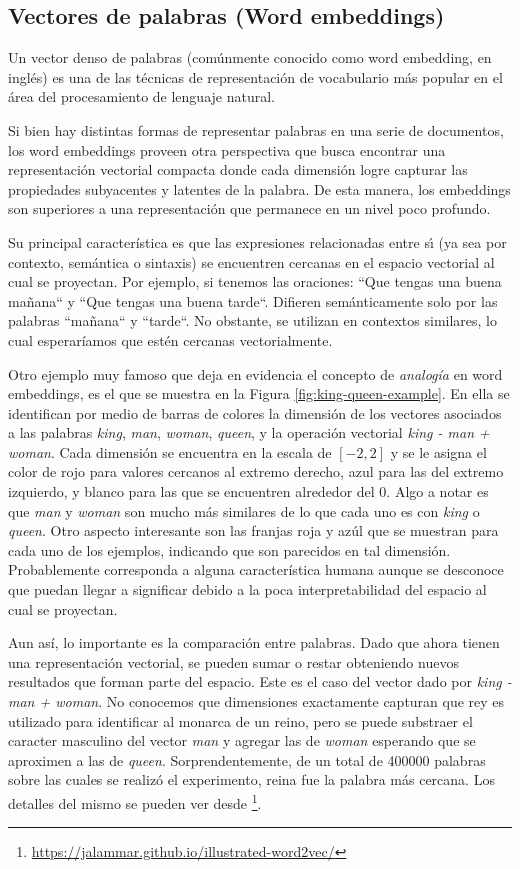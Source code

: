 \subsection{Vectores de palabras (Word embeddings)}

Un vector denso de palabras (comúnmente conocido como word embedding, en inglés)
es una de las técnicas de representación de vocabulario más popular en el área
del procesamiento de lenguaje natural.

Si bien hay distintas formas de representar palabras en una serie de documentos,
los word embeddings proveen otra perspectiva que busca encontrar una
representación vectorial compacta donde cada dimensión logre capturar las
propiedades subyacentes y latentes de la palabra. De esta manera, los embeddings
son superiores a una representación que permanece en un nivel poco profundo.

Su principal característica  es que las expresiones relacionadas entre sı́ (ya
sea por contexto, semántica o sintaxis) se encuentren cercanas en el espacio
vectorial al cual se proyectan. Por ejemplo, si tenemos las oraciones: ``Que
tengas una buena mañana`` y ``Que tengas una buena tarde``. Difieren
semánticamente solo por las palabras ``mañana`` y ``tarde``. No obstante, se
utilizan en contextos similares, lo cual esperaríamos que estén cercanas
vectorialmente.

Otro ejemplo muy famoso que deja en evidencia el concepto de \emph{analogía} en
word embeddings, es el que se muestra en la Figura \ref{fig:king-queen-example}.
En ella se identifican por medio de barras de colores la dimensión de los
vectores asociados a las palabras \emph{king}, \emph{man}, \emph{woman},
\emph{queen}, y la operación vectorial \emph{king - man + woman}. Cada dimensión
se encuentra en la escala de $[-2, 2]$ y se le asigna el color de rojo para
valores cercanos al extremo derecho, azul para las del extremo izquierdo, y
blanco para las que se encuentren alrededor del 0.  Algo a notar es que
\emph{man} y \emph{woman} son mucho más similares de lo que cada uno es con
\emph{king} o \emph{queen}. Otro aspecto interesante son las franjas roja y azúl
que se muestran para cada uno de los ejemplos, indicando que son parecidos en
tal dimensión. Probablemente corresponda a alguna característica humana aunque
se desconoce que puedan llegar a significar debido a la poca interpretabilidad
del espacio al cual se proyectan.

Aun así, lo importante es la comparación entre palabras. Dado que ahora tienen
una representación vectorial, se pueden sumar o restar obteniendo nuevos
resultados que forman parte del espacio. Este es el caso del vector dado por
\emph{king - man + woman}. No conocemos que dimensiones exactamente capturan que
rey es utilizado para identificar al monarca de un reino, pero se puede
substraer el caracter masculino del vector \emph{man} y agregar las de
\emph{woman} esperando que se aproximen a las de \emph{queen}.
Sorprendentemente, de un total de 400000 palabras sobre las cuales se realizó el
experimento, reina fue la palabra más cercana. Los detalles del mismo se pueden
ver desde \footnote{\url{https://jalammar.github.io/illustrated-word2vec/}}.

